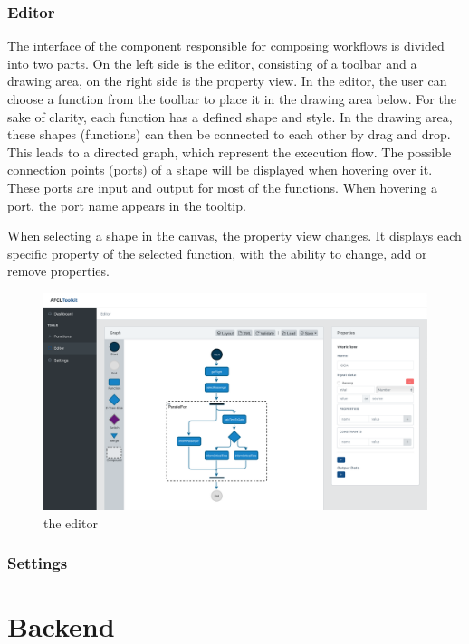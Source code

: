 \documentclass[a4paper,11pt,pdftex,halfparskip,cleardoubleempty,bibtotoc,liststotoc]{scrbook}
\begin{document}
\subsubsection{Editor}
\par
The interface of the component responsible for composing workflows is divided into two parts. On the left side is the editor, consisting of a toolbar and a drawing area, on the right side is the property view. In the editor, the user can choose a function from the toolbar to place it in the drawing area below.  For the sake of clarity, each function has a defined shape and style. In the drawing area, these shapes (functions) can then be connected to each other by drag and drop. This leads to a directed graph, which represent the execution flow. The possible connection points (ports) of a shape will be displayed when hovering over it. These ports are input and output for most of the functions. When hovering a port, the port name appears in the tooltip.
\par
When selecting a shape in the canvas, the property view changes. It displays each specific property of the selected function, with the ability to change, add or remove properties.

\begin{figure}[H]
  \centering
  \includegraphics[width=\textwidth]{editor}
  \caption{the editor}
\end{figure}

\subsubsection{Settings}

\section{Backend}
\end{document}
